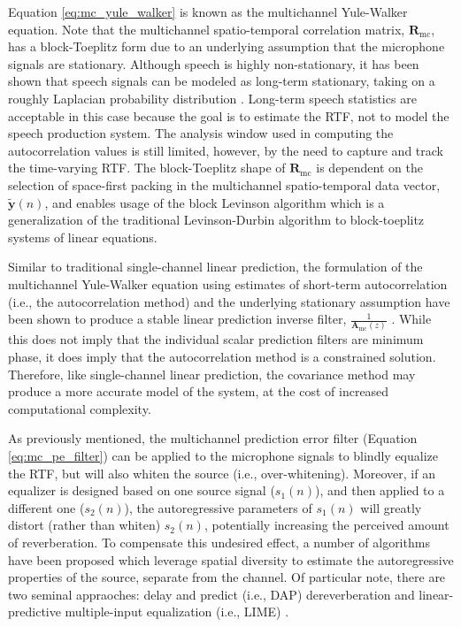 Equation \ref{eq:mc_yule_walker} is known as the multichannel Yule-Walker equation. Note that the multichannel spatio-temporal correlation matrix, $\boldsymbol{R}_{\mathrm{mc}}$, has a block-Toeplitz form due to an underlying assumption that the microphone signals are stationary. Although speech is highly non-stationary, it has been shown that speech signals can be modeled as long-term stationary, taking on a roughly Laplacian probability distribution \citep{gazor2003speech}. Long-term speech statistics are acceptable in this case because the goal is to estimate the RTF, not to model the speech production system. The analysis window used in computing the autocorrelation values is still limited, however, by the need to capture and track the time-varying RTF. The block-Toeplitz shape of  $\boldsymbol{R}_{\mathrm{mc}}$ is dependent on the selection of space-first packing in the multichannel spatio-temporal data vector, $\boldsymbol{\tilde{y}}(n)$, and enables usage of the block Levinson algorithm \citep[i.e., the multichannel Levinson algorithm, ][]{whittle1963fitting} which is a generalization of the traditional Levinson-Durbin algorithm to block-toeplitz systems of linear equations.

Similar to traditional single-channel linear prediction, the formulation of the multichannel Yule-Walker equation using estimates of short-term autocorrelation (i.e., the autocorrelation method) and the underlying stationary assumption have been shown to produce a stable linear prediction inverse filter, $\frac{1}{\boldsymbol{A}_{\mathrm{mc}}(z)}$ \citep{inouye1983modeling}. While this does not imply that the individual scalar prediction filters are minimum phase, it does imply that the autocorrelation method is a constrained solution. Therefore, like single-channel linear prediction, the covariance method may produce a more accurate model of the system, at the cost of increased computational complexity.

As previously mentioned, the multichannel prediction error filter (Equation \ref{eq:mc_pe_filter}) can be applied to the microphone signals to blindly equalize the RTF, but will also whiten the source (i.e., over-whitening). Moreover, if an equalizer is designed based on one source signal ($s_1(n)$), and then applied to a different one ($s_2(n)$), the autoregressive parameters of $s_1(n)$  will greatly distort (rather than whiten) $s_2(n)$, potentially increasing the perceived amount of reverberation. To compensate this undesired effect, a number of algorithms have been proposed which leverage spatial diversity to estimate the autoregressive properties of the source, separate from the channel.  Of particular note, there are two seminal appraoches: delay and predict (i.e., DAP) dereverberation \citep{triki2006delay} and linear-predictive multiple-input equalization (i.e., LIME) \citep{delcroix2007precise}.

